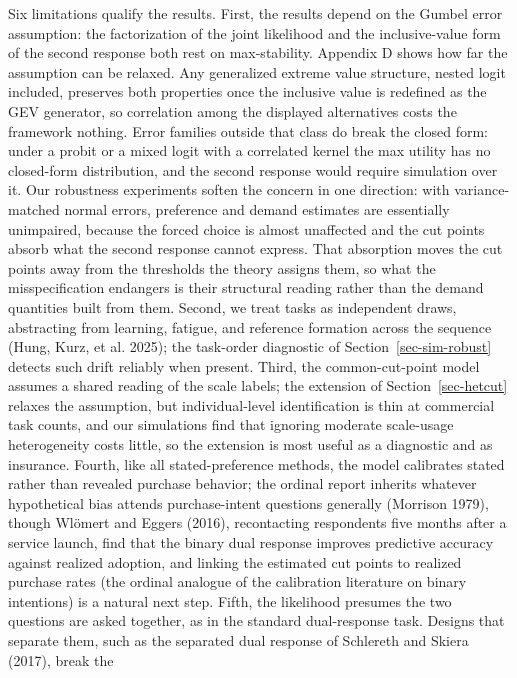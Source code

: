 \documentclass[
  letterpaper,
  DIV=11,
  numbers=noendperiod]{scrartcl}
\theoremstyle{plain}
\theoremstyle{plain}
\theoremstyle{plain}
\theoremstyle{remark}
\begin{document}
Six limitations qualify the results. First, the results depend on the
Gumbel error assumption: the factorization of the joint likelihood and
the inclusive-value form of the second response both rest on
max-stability. Appendix D shows how far the assumption can be relaxed.
Any generalized extreme value structure, nested logit included,
preserves both properties once the inclusive value is redefined as the
GEV generator, so correlation among the displayed alternatives costs the
framework nothing. Error families outside that class do break the closed
form: under a probit or a mixed logit with a correlated kernel the max
utility has no closed-form distribution, and the second response would
require simulation over it. Our robustness experiments soften the
concern in one direction: with variance-matched normal errors,
preference and demand estimates are essentially unimpaired, because the
forced choice is almost unaffected and the cut points absorb what the
second response cannot express. That absorption moves the cut points
away from the thresholds the theory assigns them, so what the
misspecification endangers is their structural reading rather than the
demand quantities built from them. Second, we treat tasks as independent
draws, abstracting from learning, fatigue, and reference formation
across the sequence (Hung, Kurz, et al. 2025); the task-order diagnostic
of Section~\ref{sec-sim-robust} detects such drift reliably when
present. Third, the common-cut-point model assumes a shared reading of
the scale labels; the extension of Section~\ref{sec-hetcut} relaxes the
assumption, but individual-level identification is thin at commercial
task counts, and our simulations find that ignoring moderate scale-usage
heterogeneity costs little, so the extension is most useful as a
diagnostic and as insurance. Fourth, like all stated-preference methods,
the model calibrates stated rather than revealed purchase behavior; the
ordinal report inherits whatever hypothetical bias attends
purchase-intent questions generally (Morrison 1979), though Wlömert and
Eggers (2016), recontacting respondents five months after a service
launch, find that the binary dual response improves predictive accuracy
against realized adoption, and linking the estimated cut points to
realized purchase rates (the ordinal analogue of the calibration
literature on binary intentions) is a natural next step. Fifth, the
likelihood presumes the two questions are asked together, as in the
standard dual-response task. Designs that separate them, such as the
separated dual response of Schlereth and Skiera (2017), break the
\end{document}
